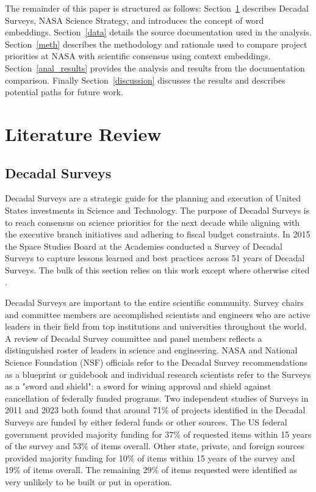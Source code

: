 \documentclass[preprint,12pt]{elsarticle}
\begin{document}

The remainder of this paper is structured as follows: Section~\ref{lit} describes Decadal Surveys, NASA Science Strategy, and introduces the concept of word embeddings. Section~\ref{data} details the source documentation used in the analysis. Section~\ref{meth} describes the methodology and rationale used to compare project priorities at NASA with scientific consensus using context embeddings.  Section~\ref{anal_results} provides the analysis and results from the documentation comparison. Finally Section~\ref{discussion} discusses the results and describes potential paths for future work. 

\section{Literature Review}
\label{lit}
\subsection{Decadal Surveys}

Decadal Surveys are a strategic guide for the planning and execution of United States investments in Science and Technology\cite{Academies2015_lessons}. The purpose of Decadal Surveys is to reach consensus on science priorities for the next decade while aligning with the executive branch initiatives and adhering to fiscal budget constraints. In 2015 the Space Studies Board at the Academies conducted a Survey of Decadal Surveys to capture lessons learned and best practices across 51 years of Decadal Surveys. The bulk of this section relies on this work except where otherwise cited \cite{Academies2015_lessons}.

Decadal Surveys are important to the entire scientific community. Survey chairs and committee members are accomplished scientists and engineers who are active leaders in their field from top institutions and universities throughout the world. A review of Decadal Survey committee and panel members reflects a distinguished roster of leaders in science and engineering. NASA and National Science Foundation (NSF) officials refer to the Decadal Survey recommendations as a blueprint or guidebook and individual research scientists refer to the Surveys as a "sword and shield": a sword for wining approval and shield against cancellation of federally funded programs. Two independent studies of Surveys in 2011 \cite{Trimble2011} and 2023 \cite{pan2023seven_Decadals} both found that around 71\% of projects identified in the Decadal Surveys are funded by either federal funds or other sources. The US federal government provided majority funding for 37\% of requested items within 15 years of the survey and 53\% of items overall. Other state, private, and foreign sources provided majority funding for 10\% of items within 15 years of the survey and 19\% of items overall. The remaining 29\% of items requested were identified as very unlikely to be built or put in operation. 
\end{document}
